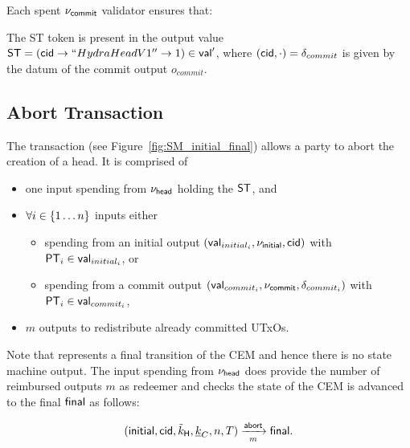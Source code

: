 \noindent Each spent $\nu_\mathsf{commit}$ validator ensures that:
\begin{menumerate}
  \item The ST token is present in the output value
  $\mathsf{ST} = (\mathsf{cid} \rightarrow ``HydraHeadV1'' \rightarrow 1) \in \mathsf{val}'$, where
  $(\mathsf{cid},\cdot) = \delta_{commit}$ is given by the datum of the commit output
  $o_{commit}$.
\end{menumerate}

\subsection{Abort Transaction}\label{sec:abort-tx}



The \mtxAbort{} transaction (see Figure~\ref{fig:SM_initial_final}) allows a
party to abort the creation of a head. It is comprised of
\begin{itemize}
  \item one input spending from $\nu_\mathsf{head}$ holding the $\mathsf{ST}$, and
  \item $\forall i \in \{1 \dots n\}$ inputs either
    \begin{itemize}
      \item spending from an initial output $(\mathsf{val}_{initial_i}, \nu_\mathsf{initial}, \mathsf{cid})$ with $\mathsf{PT}_{i} \in \mathsf{val}_{initial_i}$, or
      \item spending from a commit output $(\mathsf{val}_{commit_i}, \nu_\mathsf{commit}, \delta_{commit_i})$ with $\mathsf{PT}_{i} \in \mathsf{val}_{commit_{i}}$,
    \end{itemize}
  \item $m$ outputs to redistribute already committed UTxOs.
\end{itemize}
Note that \mtxAbort{} represents a final transition of the CEM and hence there
is no state machine output. The input spending from $\nu_\mathsf{head}$ does provide the
number of reimbursed outputs $m$ as redeemer and checks the state of the CEM is
advanced to the final $\mathsf{final}$ as follows:

\[
   (\mathsf{initial},\mathsf{cid},\tilde{k}_{\mathsf{H}},\underline{k}_C,n,T) \xrightarrow[m]{\mathsf{abort}} \mathsf{final}.
\]

